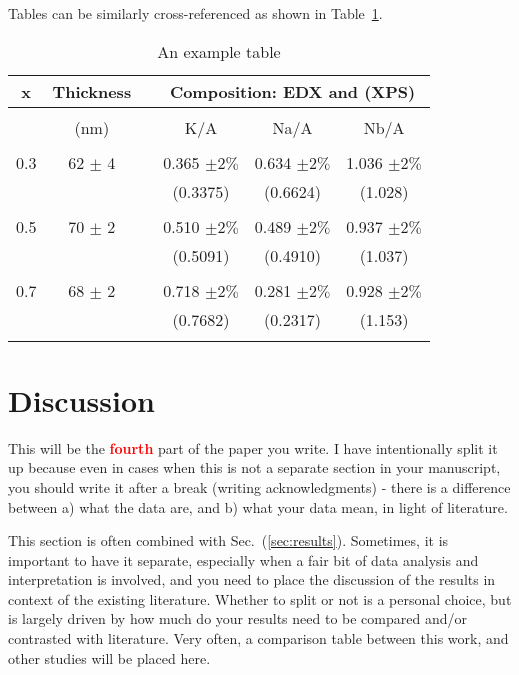 \documentclass[12 pt]{article}
\begin{document}
Tables can be similarly cross-referenced as shown in Table~\ref{tbl:ratio}.

\begin{table}
  \caption{An example table}
  \label{tbl:ratio}
  \begin{center}
    \begin{tabular}{cccccc}
      x  & Thickness & & \multicolumn{3}{c}{Composition: EDX and (XPS)} \\
      \hline \\
         & (nm) & & K/A & Na/A & Nb/A \\
      \hline \\
      0.3 & 62 $\pm$ 4 & & 0.365 $\pm 2\%$ & 0.634 $\pm 2\%$ & 1.036 $\pm 2\%$ \\
         & & & (0.3375) & (0.6624) & (1.028) \\
      \hline \\
      0.5 & 70 $\pm$ 2 & & 0.510 $\pm 2\%$ & 0.489 $\pm 2\%$ & 0.937 $\pm 2\%$ \\
         & & & (0.5091) & (0.4910) & (1.037) \\
      \hline \\
      0.7 & 68 $\pm$ 2 & & 0.718 $\pm 2\%$ & 0.281 $\pm 2\%$ & 0.928 $\pm 2\%$ \\
         & & & (0.7682) & (0.2317) & (1.153) \\
      \hline \\
    \end{tabular}
  \end{center}
\end{table}

\section{Discussion}
\label{sec:discussion}

This will be the \textbf{\Huge \textcolor{red}{fourth}} part of the paper you write. I have intentionally split it up because even in cases when this is not a separate section in your manuscript, you should write it after a break (writing acknowledgments) - there is a difference between a) what the data are, and b) what your data mean, in light of literature.

This section is often combined with Sec.~(\ref{sec:results}). Sometimes, it is important to have it separate, especially when a fair bit of data analysis and interpretation is involved, and you need to place the discussion of the results in context of the existing literature. Whether to split or not is a personal choice, but is largely driven by how much do your results need to be compared and/or contrasted with literature. Very often, a comparison table between this work, and other studies will be placed here.
\end{document}
